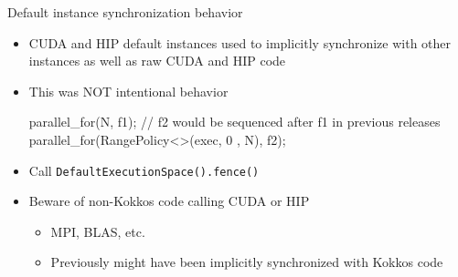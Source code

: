 
\begin{frame}[fragile]{Default instance synchronization behavior}
  \begin{itemize}
  \item CUDA and HIP default instances used to implicitly synchronize with other instances as well as raw CUDA and HIP code
  \item This was NOT intentional behavior
\begin{code}
parallel_for(N, f1);
// f2 would be sequenced after f1 in previous releases
parallel_for(RangePolicy<>(exec, 0 , N), f2);
\end{code}
  \item Call \texttt{DefaultExecutionSpace().fence()}
  \item Beware of non-Kokkos code calling CUDA or HIP
    \begin{itemize}
    \item MPI, BLAS, etc.
    \item Previously might have been implicitly synchronized with Kokkos code
    \end{itemize}
  \end{itemize}
\end{frame}
